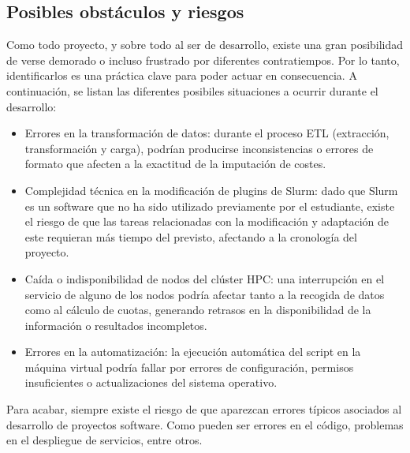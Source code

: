 \subsection{Posibles obstáculos y riesgos}
Como todo proyecto, y sobre todo al ser de desarrollo, existe una gran posibilidad de verse 
demorado o incluso frustrado por diferentes contratiempos. Por lo tanto, identificarlos es una 
práctica clave para poder actuar en consecuencia. A continuación, se listan las diferentes posibiles situaciones
a ocurrir durante el desarrollo:
\begin{itemize}
    \item Errores en la transformación de datos: durante el proceso ETL (extracción, transformación y carga), 
    podrían producirse inconsistencias o errores de formato que afecten a la exactitud de la imputación de costes.
    \item Complejidad técnica en la modificación de plugins de Slurm: dado que Slurm es un software que no ha 
    sido utilizado previamente por el estudiante, existe el riesgo de que las tareas relacionadas con la modificación 
    y adaptación de este requieran más tiempo del previsto, afectando a la cronología del proyecto.
    \item Caída o indisponibilidad de nodos del clúster HPC: una interrupción en el servicio de alguno de los nodos 
    podría afectar tanto a la recogida de datos como al cálculo de cuotas, generando retrasos en la disponibilidad 
    de la información o resultados incompletos.
    \item Errores en la automatización: la ejecución automática del script en la máquina virtual podría fallar por 
    errores de configuración, permisos insuficientes o actualizaciones del sistema operativo.
\end{itemize}
Para acabar, siempre existe el riesgo de que aparezcan errores típicos asociados al desarrollo de 
proyectos software. Como pueden ser errores en el código, problemas en el despliegue de servicios, entre otros.
